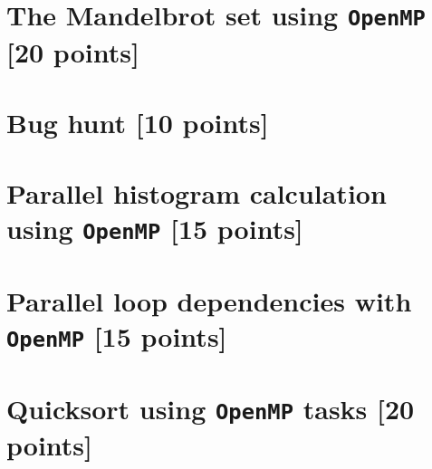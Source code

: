 \documentclass[unicode,11pt,a4paper,oneside,numbers=endperiod,openany]{scrartcl}
\begin{document}
\section{The Mandelbrot set  using \texttt{OpenMP} [20 points]}

\section{Bug hunt [10 points]}

\section{Parallel histogram calculation using \texttt{OpenMP} [15 points]}

\section{Parallel loop dependencies with \texttt{OpenMP} [15 points]}

\section{Quicksort using \texttt{OpenMP} tasks [20 points]}
\end{document}
